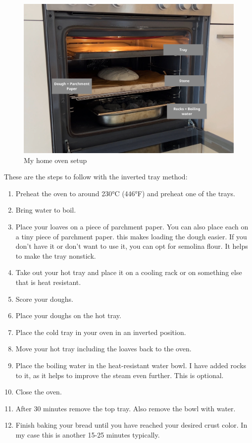 \begin{figure}[!htb]
  \includegraphics[width=\textwidth]{baking-example.jpg}
  \caption{My home oven setup}
\end{figure}

These are the steps to follow with the inverted tray method:
\begin{enumerate}
\item Preheat the oven to around 230°C (446°F) and 
preheat one of the trays.
\item Bring water to boil.
\item Place your loaves on a piece of parchment paper. You
can also place each on a tiny piece of parchment paper.
this makes loading the dough easier. If you don't
have it or don't want to use it, you can opt for 
semolina flour. It helps to make the tray nonstick.
\item Take out your hot tray and place it
on a cooling rack or on something else that
is heat resistant.
\item Score your doughs.
\item Place your doughs on the hot tray.
\item Place the cold tray in your oven in an inverted position.
\item Move your hot tray including the loaves back
to the oven.
\item Place the boiling water in the heat-resistant
water bowl. I have added rocks to it, as it helps
to improve the steam even further. This is optional.
\item Close the oven.
\item After 30 minutes remove the top tray. Also remove the bowl with water.
\item Finish baking your bread until you have reached your desired
crust color. In my case this is another 15-25 minutes typically.
\end{enumerate}

